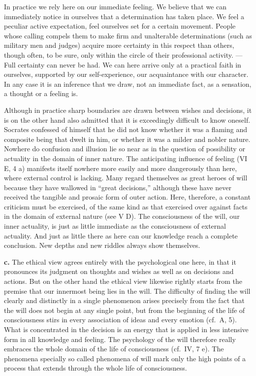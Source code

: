 \documentclass[12pt,a4paper]{book}
\newcommand{\opage}[1]{\marginnote{\footnotesize\textit{[#1]}}}
\begin{document}
In practice we rely here on our immediate feeling. We believe that we can
immediately notice in ourselves that a determination has taken place. We
feel a peculiar active expectation, feel ourselves set for a certain
movement. People whose calling compels them to make firm and unalterable
determinations (such as military men and judges) acquire more certainty
in this respect than others, though often, to be sure, only within the
circle of their professional activity. --- Full certainty can never be
had. We can here arrive only at a practical faith in ourselves, supported
by our self-experience, our acquaintance with our character. In any case
it is an inference that we draw, not an immediate fact, as a sensation, a
thought or a feeling is.

Although in practice sharp boundaries are drawn between wishes and
decisions, it is on the other hand also admitted that it is exceedingly
difficult to know oneself. Socrates confessed of himself that he did not
know whether it was a flaming and composite being that dwelt in him, or
whether it was a milder and nobler nature. Nowhere do confusion and
illusion lie so near as in the question of possibility or actuality in
the domain of inner nature. The
\opage{397}anticipating influence of feeling (VI E, 4 a) manifests itself
nowhere more easily and more dangerously than here, where external control
is lacking. Many regard themselves as great heroes of will because they
have wallowed in ``great decisions,'' although these have never received
the tangible and prosaic form of outer action. Here, therefore, a constant
criticism must be exercised, of the same kind as that exercised over
against facts in the domain of external nature (see V D). The
consciousness of the will, our inner actuality, is just as little
immediate as the consciousness of external actuality. And just as little
there as here can our knowledge reach a complete conclusion. New depths
and new riddles always show themselves.

\textbf{c.} The ethical view agrees entirely with the psychological one
here, in that it pronounces its judgment on thoughts and wishes as well as
on decisions and actions. But on the other hand the ethical view likewise
rightly starts from the premise that our innermost being lies in the will.
The difficulty of finding the will clearly and distinctly in a single
phenomenon arises precisely from the fact that the will does not begin at
any single point, but from the beginning of the life of consciousness
stirs in every association of ideas and every emotion (cf.\ A, 5). What
is concentrated in the decision is an energy that is applied in less
intensive form in all knowledge and feeling. The psychology of the will
therefore really embraces the whole domain of the life of consciousness
(cf.\ IV, 7 e). The phenomena specially so called phenomena of will mark
only the high points of a process that extends through the whole life of
consciousness.
\end{document}
